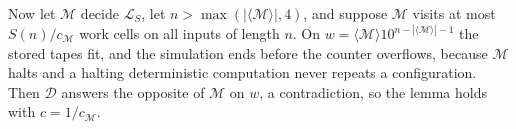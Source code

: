 \documentclass[11pt]{article}
\theoremstyle{definition}
\theoremstyle{definition}
\theoremstyle{remark}
\begin{document}
Now let $\mathcal M$ decide $\mathcal L_S$, let $n>\max(|\langle\mathcal M\rangle|,4)$, and suppose $\mathcal M$ visits at most $S(n)/c_{\mathcal M}$ work cells on all inputs of length $n$. On $w=\langle\mathcal M\rangle10^{n-|\langle\mathcal M\rangle|-1}$ the stored tapes fit, and the simulation ends before the counter overflows, because $\mathcal M$ halts and a halting deterministic computation never repeats a configuration. Then $\mathcal D$ answers the opposite of $\mathcal M$ on $w$, a contradiction, so the lemma holds with $c=1/c_{\mathcal M}$.
\end{document}
